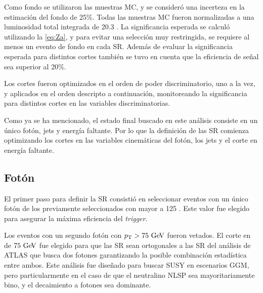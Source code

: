 Como fondo se utilizaron las muestras MC, y se consideró una incerteza en la estimación del
fondo de 25\%. Todas las muestras MC fueron normalizadas a una luminosidad total
integrada de 20.3 \ifb. La significancia esperada se calculó utilizando la
\cref{eq:Za}, y para evitar una selección muy restringida, se requiere al menos
un evento de fondo en cada SR. Además de evaluar la significancia esperada para
distintos cortes también se tuvo en cuenta que la eficiencia de señal sea
superior al 20\%.

Los cortes fueron optimizados en el orden de poder discriminatorio, uno a la
vez, y aplicados en el orden descripto a continuación, monitoreando la
significancia para distintos cortes en las variables discriminatorias.

Como ya se ha mencionado, el estado final buscado en este análisis consiste en un
único fotón, jets y energía faltante. Por lo que la definición de las SR
comienza optimizando los cortes en las variables cinemáticas del fotón, los jets
y el corte en energía faltante.




\subsection{Fotón}\label{sec:opt_ph_iso}

El primer paso para definir la SR consistió en seleccionar eventos con un único
fotón de los previamente seleccionados con {\pt} mayor a 125 \gev. Este valor
fue elegido para asegurar la máxima eficiencia del \emph{trigger}.

Los eventos con un segundo fotón con $\pt > 75 \gev$ fueron vetados. El corte en
{\pt} de $75\gev$ fue elegido para que las SR sean ortogonales a las SR del
análisis de ATLAS que busca dos fotones\cite{ATLAS-CONF-2014-001} garantizando la
posible combinación estadística entre ambos. Este análisis fue diseñado para
buscar SUSY en escenarios GGM, pero particularmente en el caso de que el
neutralino NLSP sea mayoritariamente bino, y el decaimiento a fotones sea
dominante.


